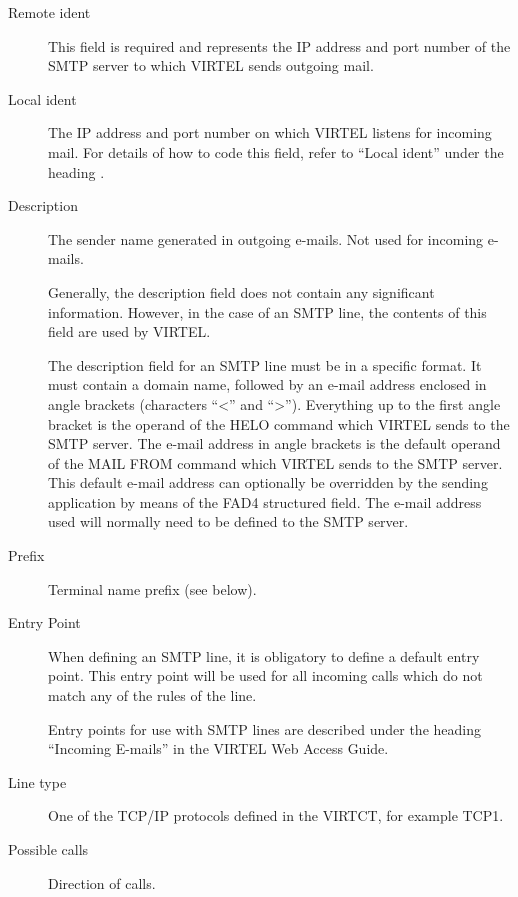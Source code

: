 \documentclass[letterpaper,10pt,english]{sphinxmanual}
\begin{document}
\begin{description}
\item[{Remote ident}] \leavevmode
This field is required and represents the IP address and port number of the SMTP server to which VIRTEL sends outgoing mail.

\item[{Local ident}] \leavevmode
The IP address and port number on which VIRTEL listens for incoming mail. For details of how to code this field, refer to “Local ident” under the heading {\hyperref[\detokenize{connectivity_guide:bookmark13}]{}}.

\item[{Description}] \leavevmode
The sender name generated in outgoing e-mails. Not used for incoming e-mails.

Generally, the description field does not contain any significant information. However, in the case of an SMTP line, the contents of this field are used by VIRTEL.

The description field for an SMTP line must be in a specific format. It must contain a domain name, followed by an e-mail address enclosed in angle brackets (characters “\textless{}” and “\textgreater{}”). Everything up to the first angle bracket is the operand of the HELO command which VIRTEL sends to the SMTP server. The e-mail address in angle brackets is the default operand of the MAIL FROM command which VIRTEL sends to the SMTP server. This default e-mail address can optionally be overridden by the sending application by means of the
FAD4 structured field. The e-mail address used will normally need to be defined to the SMTP server.

\item[{Prefix}] \leavevmode
Terminal name prefix (see below).

\item[{Entry Point}] \leavevmode
When defining an SMTP line, it is obligatory to define a default entry point. This entry point will be used for all incoming calls which do not match any of the rules of the line.

Entry points for use with SMTP lines are described under the heading “Incoming E-mails” in the VIRTEL Web Access Guide.

\item[{Line type}] \leavevmode
One of the TCP/IP protocols defined in the VIRTCT, for example TCP1.

\item[{Possible calls}] \leavevmode
Direction of calls.


\end{description}
\end{document}
